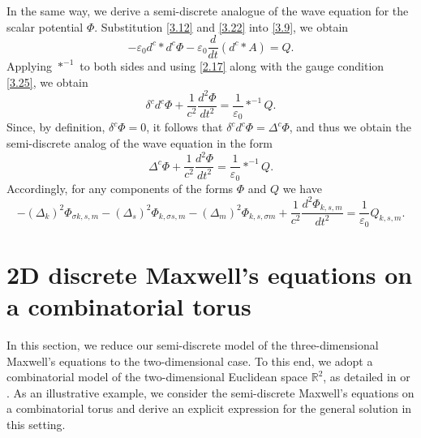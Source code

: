 \documentclass[english]{article}
\theoremstyle{plain}
\theoremstyle{definition}
\theoremstyle{remark}
\numberwithin{equation}{section}
\begin{document}
In the same way, we derive a semi-discrete analogue of the wave equation for the scalar potential $\Phi$. Substitution \eqref{3.12} and \eqref{3.22} into
\eqref{3.9}, we obtain
\begin{equation*}
-\varepsilon_0d^c\ast d^c \Phi -\varepsilon_0\frac{d}{dt}\left(d^c\ast A\right)=Q.
 \end{equation*}
 Applying $\ast^{-1}$ to both sides and using \eqref{2.17} along with the gauge condition \eqref{3.25}, we obtain
\begin{equation*}
\delta^cd^c \Phi +\frac{1}{c^2}\frac{d^2\Phi}{dt^2}=\frac{1}{\varepsilon_0}\ast^{-1}Q.
 \end{equation*}
Since, by definition, $\delta^c\Phi=0$, it follows that $\delta^cd^c \Phi=\Delta^c\Phi$, and thus we obtain the semi-discrete analog of the wave equation in the form
\begin{equation*}
\Delta^c\Phi +\frac{1}{c^2}\frac{d^2\Phi}{dt^2}=\frac{1}{\varepsilon_0}\ast^{-1}Q.
 \end{equation*}
 Accordingly, for any components of the forms $\Phi$ and $Q$ we have
 \begin{equation*}\label{}
-(\Delta_k)^2\Phi_{\sigma k,s,m}-(\Delta_s)^2\Phi_{k,\sigma s,m}-(\Delta_m)^2\Phi_{k,s,\sigma m}+\frac{1}{c^2}\frac{d^2\Phi_{k,s,m}}{dt^2}=\frac{1}{\varepsilon_0}Q_{k,s,m}.
\end{equation*}





\section{2D discrete Maxwell's equations on a combinatorial torus}
In this section, we reduce our semi-discrete model of the three-dimensional  Maxwell's equations to the two-dimensional case.
To this end, we adopt a combinatorial model of the two-dimensional Euclidean space
$\mathbb{R}^2$,  as detailed in \cite{S5} or \cite{S6}. As an illustrative example, we consider the semi-discrete Maxwell’s equations on a combinatorial torus and derive an explicit expression for the general solution in this setting.
\end{document}
